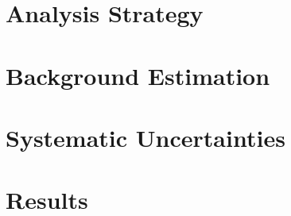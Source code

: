 \section{Analysis Strategy}

\section{Background Estimation}

\section{Systematic Uncertainties}

\section{Results}